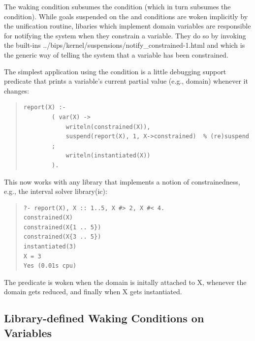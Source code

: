 The  waking condition subsumes the 
condition
(which in turn subsumes the  condition).
While goals suspended on the  and  conditions
are woken implicitly by the unification routine, libaries which implement
domain variables are responsible for notifying the system when they
constrain a variable. They do so by invoking the built-ins
%
{../bips/kernel/suspensions/notify_constrained-1.html}
and 
which is the generic way of telling the system that a variable has been
constrained.

The simplest application using the  condition is a little
debugging support predicate that prints a variable's current partial value
(e.g., domain) whenever it changes:
\begin{quote}
\begin{verbatim}
report(X) :-
        ( var(X) ->
            writeln(constrained(X)),
            suspend(report(X), 1, X->constrained)  % (re)suspend
        ;
            writeln(instantiated(X))
        ).
\end{verbatim}
\end{quote}
This now works with any library that implements a notion of constrainedness,
e.g., the interval solver library(ic):
\begin{quote}
\begin{verbatim}
?- report(X), X :: 1..5, X #> 2, X #< 4.
constrained(X)
constrained(X{1 .. 5})
constrained(X{3 .. 5})
instantiated(3)
X = 3
Yes (0.01s cpu)
\end{verbatim}
\end{quote}
The  predicate is woken when the domain is initally attached
to X,
whenever the domain gets reduced, and finally when X gets instantiated.



\subsection{Library-defined Waking Conditions on Variables}

